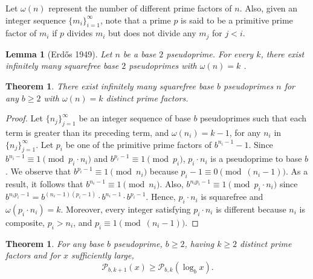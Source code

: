 \documentclass[11pt]{article}
\theoremstyle{plain}
\newtheorem{theorem}[subsubsection]{Theorem}
\newtheorem{lemma}[subsubsection]{Lemma}
\theoremstyle{definition}
\theoremstyle{remark}
\numberwithin{equation}{subsection}
\begin{document}
\newline
\indent Let $\omega(n)$ represent the number of different prime factors of $n$. Also, given an integer sequence $\{m_i\}_{i=1}^{\infty}$, note that a prime $p$ is said to be a primitive prime factor of $m_i$ if $p$ divides $m_i$ but does not divide any $m_j$ for $j < i$.
\begin{lemma}[Erd\H{o}s 1949] \label{pseudo5}
Let $n$ be a base $2$ pseudoprime. For every $k$, there exist infinitely many squarefree base $2$ pseudoprimes with $\omega(n)=k$ \emph{\cite{2}}.
\end{lemma}
\begin{theorem} \label{pseudo6}
There exist infinitely many squarefree base $b$ pseudoprimes $n$ for any $b \ge 2$ with $\omega(n) = k$ distinct prime factors.
\end{theorem}
\begin{proof}
Let $\{n_j\}_{j=1}^{\infty}$ be an integer sequence of base $b$ pseudoprimes such that each term is greater than its preceding term, and $\omega(n_i) = {k}-1$, for any $n_i$ in $\{n_j\}_{j=1}^{\infty}$. Let $p_i$ be one of the primitive prime factors of ${b^{{n_i}-1}}-1$. Since $b^{{n_i}-1} \equiv 1 \pmod {{p_i}\cdot{n_i}}$ and $b^{{p_i}-1} \equiv 1 \pmod {p_i}$, ${p_i}\cdot{n_i}$ is a pseudoprime to base $b$. We observe that $b^{p_i-1} \equiv 1 \pmod {n_i}$ because $p_i-1 \equiv 0 \pmod {(n_i-1)}$. As a result, it follows that $b^{n_i-1} \equiv 1 \pmod {n_i}$. Also, $b^{{n_i}{p_i}-1} \equiv 1 \pmod {{p_i}\cdot{n_i}}$ since $b^{{n_i}{p_i}-1} = {b^{(n_i-1)(p_i-1)}}\cdot{b^{{n_i}-1}}\cdot{b^{{p_i}-1}}$. Hence, ${p_i}\cdot{n_i}$ is squarefree and $\omega({p_i}\cdot{n_i})=k$. Moreover, every integer satisfying ${p_i}\cdot{n_i}$ is different because $n_i$ is composite, $p_i > n_i$, and $p_i \equiv 1 \pmod {({n_i}-1)}$.
\end{proof}
\begin{theorem} \label{pseudo7}
For any base $b$ pseudoprime, $b \ge 2$, having $k \ge 2$ distinct prime factors and for $x$ sufficiently large,
\begin{equation} \label{21}
\mathscr{P}_{b,{{k}+1}}(x) \ge \mathscr{P}_{b,k}(\log_{b} x).
\end{equation}
\end{theorem}
\end{document}
